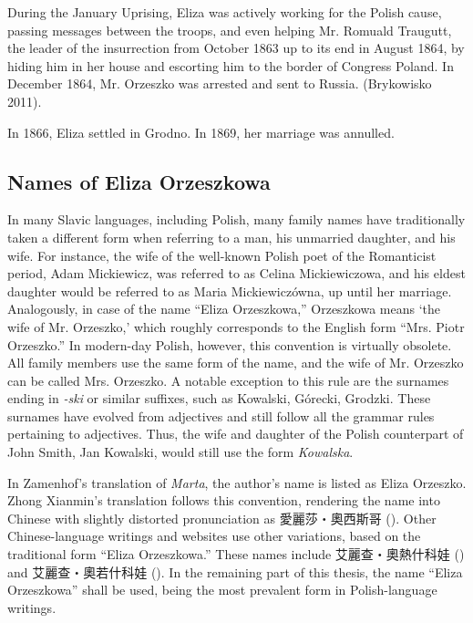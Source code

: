 During the January Uprising, Eliza was actively working for the Polish cause, passing messages between the troops, and even helping Mr. Romuald Traugutt, the leader of the insurrection from October 1863 up to its end in August 1864, by hiding him in her house and escorting him to the border of Congress Poland.
In December 1864, Mr. Orzeszko was arrested and sent to Russia.
(Brykowisko 2011).

In 1866, Eliza settled in Grodno. In 1869, her marriage was annulled.

\subsection{Names of Eliza Orzeszkowa}

In many Slavic languages, including Polish, many family names have traditionally taken a different form when referring to a man, his unmarried daughter, and his wife.
For instance, the wife of the well-known Polish poet of the Romanticist period, Adam Mickiewicz, was referred to as Celina Mickiewiczowa, and his eldest daughter would be referred to as Maria Mickiewiczówna, up until her marriage.
Analogously, in case of the name ``Eliza Orzeszkowa,'' Orzeszkowa means `the wife of Mr. Orzeszko,' which roughly corresponds to the English form ``Mrs. Piotr Orzeszko.''
In modern-day Polish, however, this convention is virtually obsolete.
All family members use the same form of the name, and the wife of Mr. Orzeszko can be called Mrs. Orzeszko.
A notable exception to this rule are the surnames ending in \textit{-ski} or similar suffixes, such as Kowalski, Górecki, Grodzki.
These surnames have evolved from adjectives and still follow all the grammar rules pertaining to adjectives.
Thus, the wife and daughter of the Polish counterpart of John Smith, Jan Kowalski, would still use the form \textit{Kowalska}. 

In Zamenhof's translation of \textit{Marta}, the author's name is listed as Eliza Orzeszko.
Zhong Xianmin's translation follows this convention, rendering the name into Chinese with slightly distorted pronunciation as 愛麗莎・奧西斯哥 ().
Other Chinese-language writings and websites use other variations, based on the traditional form ``Eliza Orzeszkowa.''
These names include 艾麗查・奧熱什科娃 () and 艾麗查・奧若什科娃 (). In the remaining part of this thesis, the name ``Eliza Orzeszkowa'' shall be used, being the most prevalent form in Polish-language writings.


